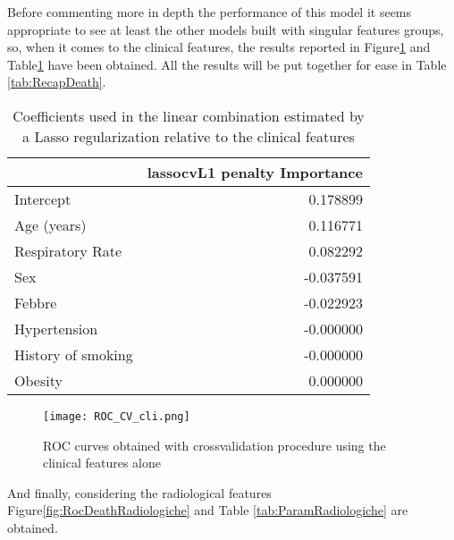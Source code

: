 Before commenting more in depth the performance of this model it seems appropriate to see at least the other models built with singular features groups, so, when it comes to the clinical features, the results reported in Figure\ref{fig:RocDeathCli} and Table\ref{tab:ParamCli} have been obtained. All the results will be put together for ease in Table \ref{tab:RecapDeath}.

\begin{table}
\caption{Coefficients used in the linear combination estimated by a Lasso regularization relative to the clinical features\label{tab:ParamCli}}
\centering
	\begin{tabular}{lr}
		\toprule
		{} &  lassocvL1 penalty Importance \\
		\midrule
		Intercept          &                      0.178899 \\
		Age (years)        &                      0.116771 \\
		Respiratory Rate   &                      0.082292 \\
		Sex           &                     -0.037591 \\
		Febbre             &                     -0.022923 \\
		Hypertension       &                     -0.000000 \\
		History of smoking &                     -0.000000 \\
		Obesity            &                      0.000000 \\
		\bottomrule
	\end{tabular}
\end{table}

\begin{figure}[htbp]
	\centering
  		\texttt{[image: ROC\_CV\_cli.png]}
        \caption{ROC curves obtained with crossvalidation procedure using the clinical features alone\label{fig:RocDeathCli}}
\end{figure}

And finally, considering the radiological features Figure\ref{fig:RocDeathRadiologiche} and Table \ref{tab:ParamRadiologiche} are obtained.

